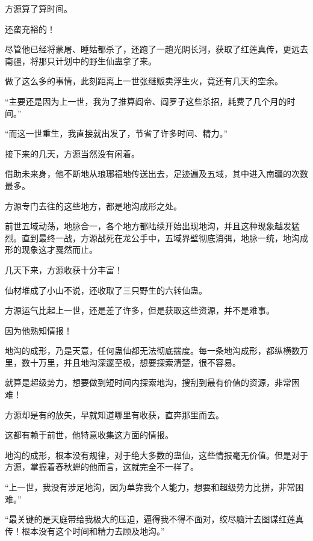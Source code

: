 
\begin{this_body}



方源算了算时间。

还蛮充裕的！

尽管他已经将蒙屠、睡姑都杀了，还跑了一趟光阴长河，获取了红莲真传，更远去南疆，将那只计划中的野生仙蛊拿了来。

做了这么多的事情，此刻距离上一世张继贩卖浮生火，竟还有几天的空余。

“主要还是因为上一世，我为了推算阎帝、阎罗子这些杀招，耗费了几个月的时间。”

“而这一世重生，我直接就出发了，节省了许多时间、精力。”

接下来的几天，方源当然没有闲着。

借助未来身，他不断地从琅琊福地传送出去，足迹遍及五域，其中进入南疆的次数最多。

方源专门去往的这些地方，都是地沟成形之处。

前世五域动荡，地脉合一，各个地方都陆续开始出现地沟，并且这种现象越发猛烈。直到最终一战，方源战死在龙公手中，五域界壁彻底消弭，地脉一统，地沟成形的现象这才戛然而止。

几天下来，方源收获十分丰富！

仙材堆成了小山不说，还收取了三只野生的六转仙蛊。

方源运气比起上一世，还是差了许多，但是获取这些资源，并不是难事。

因为他熟知情报！

地沟的成形，乃是天意，任何蛊仙都无法彻底揣度。每一条地沟成形，都纵横数万里，数十万里，并且地沟深邃至极，想要探索清楚，很不容易。

就算是超级势力，想要做到短时间内探索地沟，搜刮到最有价值的资源，非常困难！

方源却是有的放矢，早就知道哪里有收获，直奔那里而去。

这都有赖于前世，他特意收集这方面的情报。

地沟的成形，根本没有规律，对于绝大多数的蛊仙，这些情报毫无价值。但是对于方源，掌握着春秋蝉的他而言，这就完全不一样了。

“上一世，我没有涉足地沟，因为单靠我个人能力，想要和超级势力比拼，非常困难。”

“最关键的是天庭带给我极大的压迫，逼得我不得不面对，绞尽脑汁去图谋红莲真传！根本没有这个时间和精力去顾及地沟。”


\end{this_body}
